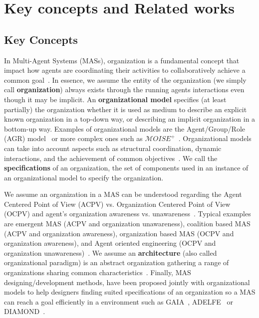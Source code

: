 \documentclass{ecai}
\begin{document}

\section{Key concepts and Related works}



\subsection{Key Concepts}

In Multi-Agent Systems (MASs), organization is a fundamental concept that impact how agents are coordinating their activities to collaboratively achieve a common goal~\citep{Hubner2002}. In essence, we assume the entity of the organization (we simply call \textbf{organization}) always exists through the running agents interactions even though it may be implicit.
An \textbf{organizational model} specifies (at least partially) the organization whether it is used as medium to describe an explicit known organization in a top-down way, or describing an implicit organization in a bottom-up way. Examples of organizational models are the Agent/Group/Role (AGR) model~\citep{Ferber2004} or more complex ones such as $\mathcal{M}OISE^{+}$~\citep{Hubner2002}. Organizational models can take into account aspects such as structural coordination, dynamic interactions, and the achievement of common objectives~\citep{Ferber2004, Abbas2015}. We call the \textbf{specifications} of an organization, the set of components used in an instance of an organizational model to specify the organization.

We assume an organization in a MAS can be understood regarding the Agent Centered Point of View (ACPV) vs. Organization Centered Point of View (OCPV) and agent's organization awareness vs. unawareness~\citep{Picard2009}.
Typical examples are emergent MAS (ACPV and organization unawareness), coalition based MAS (ACPV and organization awareness), organization based MAS (OCPV and organization awareness), and Agent oriented engineering (OCPV and organization unawareness)~\citep{Picard2009}.
We assume an \textbf{architecture} (also called organizational paradigm) is an abstract organization gathering a range of organizations sharing common characteristics~\citep{Horling2004}. Finally, MAS designing/development methods, have been proposed jointly with organizational models to help designers finding suited specifications of an organization so a MAS can reach a goal efficiently in a environment such as GAIA~\citep{Wooldridge2000}, ADELFE~\citep{Bernon2003} or DIAMOND~\citep{Jamont2005}.
\end{document}
